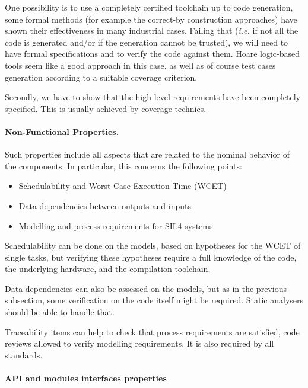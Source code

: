 \documentclass{template/openetcs_article}
\begin{document}
One possibility is to use a completely certified toolchain up
to code generation, some formal methods (for example the correct-by construction approaches) have shown their effectiveness in many industrial cases. Failing that ({\it i.e.} if not all the code is generated
and/or if the generation cannot be trusted), we will need to have formal
specifications and to verify the code against them. Hoare logic-based tools
seem like a good approach in this case, as well as of course test cases
generation according to a suitable coverage criterion.

Secondly, we have to  show that the high level requirements have been completely specified. This is usually  achieved by coverage technics. 

\paragraph{Non-Functional Properties.}

Such properties include all aspects that are related to the nominal behavior
of the components. In particular, this concerns the following points:
\begin{itemize}
\item Schedulability and Worst Case Execution Time (WCET)
\item Data dependencies between outputs and inputs
\item Modelling and process requirements for SIL4 systems
\end{itemize}

Schedulability can be done on the models, based on hypotheses for the WCET of
single tasks, but verifying these hypotheses require a full knowledge of
the code, the underlying hardware, and the compilation toolchain.

Data dependencies can also be assessed on the models, but as in the previous
subsection, some verification on the code itself might be required. Static
analysers should be able to handle that.

Traceability  items can help  to  check  that process requirements are satisfied, code reviews allowed to  verify modelling requirements.  It is also required by all standards.

\paragraph{API and modules interfaces properties}
\end{document}
